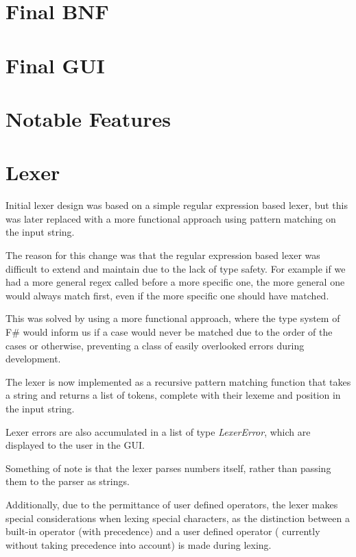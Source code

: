 \section{Final BNF}\label{sec:final-bnf}



\section{Final GUI}\label{sec:final-gui}

\section{Notable Features}\label{sec:notable-features}

\section{Lexer}\label{sec:lexer}

Initial lexer design was based on a simple regular expression based lexer, but this was later replaced with a more
functional approach using pattern matching on the input string.

The reason for this change was that the regular expression based lexer was difficult to extend and maintain due to 
the lack of type safety.
For example if we had a more general regex called before a more specific one, the more general one would always match
first, even if the more specific one should have matched.

This was solved by using a more functional approach, where the type system of F\# would inform us if a case would 
never be matched due to the order of the cases or otherwise, preventing a class of easily overlooked errors during development.

The lexer is now implemented as a recursive pattern matching function that takes a string and returns a list of 
tokens, complete with their lexeme and position in the input string.

Lexer errors are also accumulated in a list of type \textit{LexerError}, which are displayed to the user in the GUI\@.

Something of note is that the lexer parses numbers itself, rather than passing them to the parser as strings.

Additionally, due to the permittance of user defined operators, the lexer makes special considerations when lexing 
special characters, as the distinction between a built-in operator (with precedence) and a user defined operator (
currently without taking precedence into account) is made during lexing.

